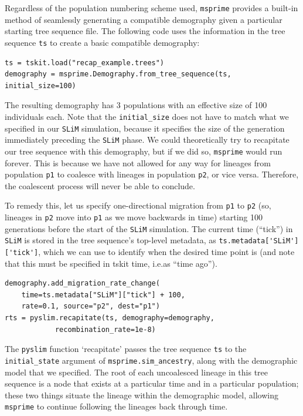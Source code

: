 \documentclass[12pt]{article}
\newcommand{\msprime}[0]{\texttt{msprime}\xspace}
\newcommand{\slim}[0]{\texttt{SLiM}\xspace}
\newcommand{\pyslim}[0]{\texttt{pyslim}\xspace}
\newcommand*{\ie}{i.e.\xcomma}
\newcommand{\p}[1]{\texttt{p#1}}
\begin{document}
Regardless of the population numbering scheme used, \msprime provides a built-in method of seamlessly generating a
compatible demography given a particular starting tree sequence file. The following code uses the information in the tree sequence \verb|ts|
to create a basic compatible demography:
\begin{verbatim}
ts = tskit.load("recap_example.trees")
demography = msprime.Demography.from_tree_sequence(ts, initial_size=100)
\end{verbatim}
The resulting demography has 3 populations with an effective size of 100 individuals each.
Note that the \verb|initial_size|
does not have to match what we specified in our \slim simulation, because it specifies the size of the generation
immediately preceding the \slim phase. We could theoretically try to recapitate our tree sequence with this
demography, but if we did so, \msprime would run forever. This is because we have not allowed for any way for
lineages from population \p1 to coalesce with lineages in population \p2, or vice versa.
Therefore, the coalescent process will never be able to conclude.

To remedy this,
let us specify one-directional migration from \p1 to \p2 (so, lineages in \p2 move into \p1 as we move backwards in time)
starting 100 generations before the start of the \slim simulation.
The current time (``tick'') in \slim is stored in the tree sequence's top-level metadata, as \verb|ts.metadata['SLiM']['tick']|,
which we can use to identify when the desired time point is
(and note that this must be specified in tskit time, \ie as ``time ago'').
\begin{verbatim}
demography.add_migration_rate_change(
    time=ts.metadata["SLiM"]["tick"] + 100,
    rate=0.1, source="p2", dest="p1")
rts = pyslim.recapitate(ts, demography=demography,
            recombination_rate=1e-8)
\end{verbatim}

The \pyslim function `recapitate' passes the tree sequence \verb|ts| to the
\verb|initial_state| argument of \verb|msprime.sim_ancestry|,
along with the demographic model that we specified.
The root of each uncoalesced lineage in this tree sequence is a node
that exists at a particular time and in a particular population;
these two things situate the lineage within the demographic model,
allowing \msprime to continue following the lineages back through time.
\end{document}
